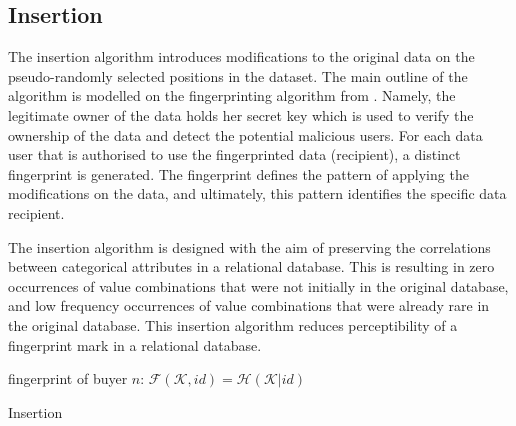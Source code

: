 \documentclass[runningheads]{llncs}
\begin{document}
\subsection{Insertion}\label{subsec:insertion}
The insertion algorithm introduces modifications to the original data on the pseudo-randomly selected positions in the dataset.
The main outline of the algorithm is modelled on the fingerprinting algorithm from \cite{li2005fingerprinting}. Namely, the legitimate owner of the data holds her secret key which is used to verify the ownership of the data and detect the potential malicious users.
For each data user that is authorised to use the fingerprinted data (recipient), a distinct fingerprint is generated. The fingerprint defines the pattern of applying the modifications on the data, and ultimately, this pattern identifies the specific data recipient.
 
The insertion algorithm is designed with the aim of preserving the correlations between categorical attributes in a relational database.
This is resulting in zero occurrences of value combinations that were not initially in the original database, and low frequency occurrences of value combinations that were already rare in the original database.
This insertion algorithm reduces perceptibility of a fingerprint mark in a relational database.


\begin{algorithm}
  fingerprint of buyer $n$: $\mathcal{F}(\mathcal{K},id)=\mathcal{H}(\mathcal{K}|id)$
  \\
  {
    
  }
  \caption{Insertion}
  \label{alg:insertion}
\end{algorithm}
\end{document}
